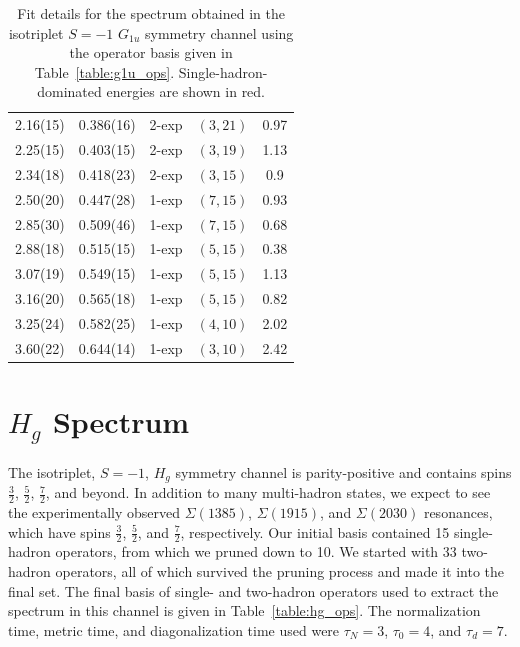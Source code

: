 \begin{table}[H]
\begin{tabu}{c|c|c|c|c}
        2.16(15)&0.386(16)&2{-}exp&$(3, 21)$&0.97\\
        2.25(15)&0.403(15)&2{-}exp&$(3, 19)$&1.13\\
        2.34(18)&0.418(23)&2{-}exp&$(3, 15)$&0.9\\
        2.50(20)&0.447(28)&1{-}exp&$(7, 15)$&0.93\\
        2.85(30)&0.509(46)&1{-}exp&$(7, 15)$&0.68\\
        \rowfont{\color{red}}
        2.88(18)&0.515(15)&1{-}exp&$(5, 15)$&0.38\\
        \rowfont{\color{red}}
        3.07(19)&0.549(15)&1{-}exp&$(5, 15)$&1.13\\
        \rowfont{\color{red}}
        3.16(20)&0.565(18)&1{-}exp&$(5, 15)$&0.82\\
        3.25(24)&0.582(25)&1{-}exp&$(4, 10)$&2.02\\
        3.60(22)&0.644(14)&1{-}exp&$(3, 10)$&2.42\\
    \end{tabu}
    \caption{Fit details for the spectrum obtained in the isotriplet $S=-1$ $G_{1u}$ symmetry channel using the operator basis given in Table~\ref{table:g1u_ops}. Single-hadron-dominated energies are shown in red.}\label{table:g1u_fits}
\end{table}
\renewcommand{\arraystretch}{1.5}
\newpage
\section{$H_g$ Spectrum}
The isotriplet, $S=-1$, $H_g$ symmetry channel is parity-positive and contains spins $\frac{3}{2}$, $\frac{5}{2}$, $\frac{7}{2}$, and beyond. In addition to many multi-hadron states, we expect to see the experimentally observed $\Sigma(1385)$, $\Sigma(1915)$, and $\Sigma(2030)$ resonances, which have spins $\frac{3}{2}$, $\frac{5}{2}$, and $\frac{7}{2}$, respectively. Our initial basis contained 15 single-hadron operators, from which we pruned down to 10. We started with 33 two-hadron operators, all of which survived the pruning process and made it into the final set. The final basis of single- and two-hadron operators used to extract the spectrum in this channel is given in Table~\ref{table:hg_ops}. The normalization time, metric time, and diagonalization time used were $\tau_N=3$, $\tau_0=4$, and $\tau_d=7$. 

